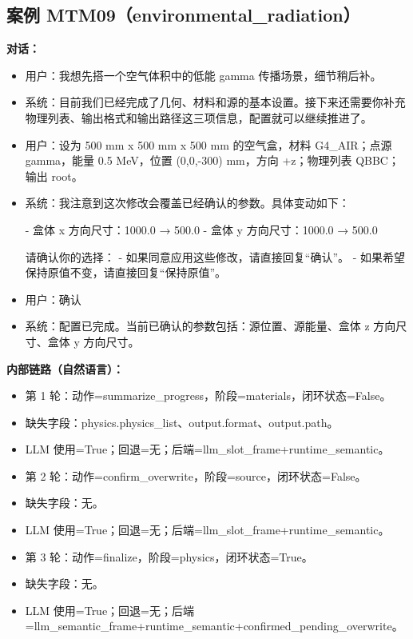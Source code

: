 \documentclass[11pt]{ctexart}
\begin{document}
\subsection{案例 MTM09（environmental\_radiation）}
\textbf{对话：}
\begin{itemize}
\item 用户：我想先搭一个空气体积中的低能 gamma 传播场景，细节稍后补。
\item 系统：目前我们已经完成了几何、材料和源的基本设置。接下来还需要你补充物理列表、输出格式和输出路径这三项信息，配置就可以继续推进了。
\item 用户：设为 500 mm x 500 mm x 500 mm 的空气盒，材料 G4\_AIR；点源 gamma，能量 0.5 MeV，位置 (0,0,-300) mm，方向 +z；物理列表 QBBC；输出 root。
\item 系统：我注意到这次修改会覆盖已经确认的参数。具体变动如下：

- 盒体 x 方向尺寸：1000.0 → 500.0
- 盒体 y 方向尺寸：1000.0 → 500.0

请确认你的选择：
- 如果同意应用这些修改，请直接回复“确认”。
- 如果希望保持原值不变，请直接回复“保持原值”。
\item 用户：确认
\item 系统：配置已完成。当前已确认的参数包括：源位置、源能量、盒体 z 方向尺寸、盒体 y 方向尺寸。
\end{itemize}
\textbf{内部链路（自然语言）：}
\begin{itemize}
\item 第 1 轮：动作=summarize\_progress，阶段=materials，闭环状态=False。
\item 缺失字段：physics.physics\_list、output.format、output.path。
\item LLM 使用=True；回退=无；后端=llm\_slot\_frame+runtime\_semantic。
\item 第 2 轮：动作=confirm\_overwrite，阶段=source，闭环状态=False。
\item 缺失字段：无。
\item LLM 使用=True；回退=无；后端=llm\_slot\_frame+runtime\_semantic。
\item 第 3 轮：动作=finalize，阶段=physics，闭环状态=True。
\item 缺失字段：无。
\item LLM 使用=True；回退=无；后端=llm\_semantic\_frame+runtime\_semantic+confirmed\_pending\_overwrite。
\end{itemize}
\end{document}
